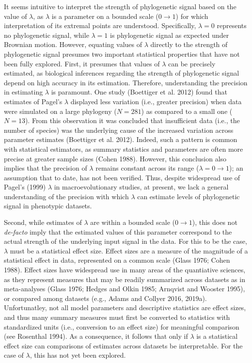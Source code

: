 \documentclass[]{article}
\begin{document}
It seems intuitive to interpret the strength of phylogenetic signal
based on the value of \(\lambda\), as \(\lambda\) is a parameter on a
bounded scale (\(0\to1\)) for which interpretation of its extremal
points are understood. Specifically, \(\lambda=0\) represents no
phylogenetic signal, while \(\lambda=1\) is phylogenetic signal as
expected under Brownian motion. However, equating values of \(\lambda\)
directly to the strength of phylogenetic signal presumes two important
statistical properties that have not been fully explored. First, it
presumes that values of \(\lambda\) can be precisely estimated, as
biological inferences regarding the strength of phylogenetic signal
depend on high accuracy in its estimation. Therefore, understanding the
precision in estimating \(\lambda\) is paramount. One study (Boettiger
et al. 2012) found that estimates of Pagel's \(\lambda\) displayed less
variation (i.e., greater precision) when data were simulated on a large
phylogeny (\(N=281\)) as compared to a small one (\(N=13\)). From this
observation it was concluded that insufficient data (i.e., the number of
species) was the underlying cause of the increased variation across
parameter estimates (Boettiger et al. 2012). Indeed, such a pattern is
common with statistical estimators, as summary statistics and parameters
are often more precise at greater sample sizes (Cohen 1988). However,
this conclusion also implies that the precision of \(\lambda\) remains
constant across its range (\(\lambda = 0 \to 1\)); an assumption that to
date, has not been verified. Thus, despite widespread use of Pagel's
(1999) \(\lambda\) in macroevolutionary studies, at present, we lack a
general understanding of the precision with which \(\lambda\) can
estimate levels of phylogenetic signal in phenotypic datasets.
\hfill\break

Second, while estimates of \(\lambda\) are within a bounded scale
(\(0\to1\)), this does not \emph{de-facto} imply that the estimated
values of this parameter correspond to the actual strength of the
underlying input signal in the data. For this to be the case,
\(\lambda\) must be a statistical effect size. Effect sizes are a
measure of the magnitude of a statistical effect in data, represented on
a common scale (Glass 1976; Cohen 1988). Effect sizes have widespread
use in many areas of the quantiative sciences, as they represent
measures that may be readily summarized across datasets as in
meta-analyses (Glass 1976; Hedges and Olkin 1985; Arnqvist and Wooster
1995), or compared among datasets (e.g., Adams and Collyer 2016, 2019a).
Unfortunatley, not all model parameters and descriptive statistics are
effect sizes, and thus many summary measures must first be converted to
statistics with standardized units (i.e., conversion to an effect size)
for meaningful comparison (see Rosenthal 1994). As a consequence, it
follows that only if \(\lambda\) is a statistical effect size can
comparisons of estimates across datasets be interpretable. For the case
of \(\lambda\), this has not yet been explored. \hfill\break
\end{document}
